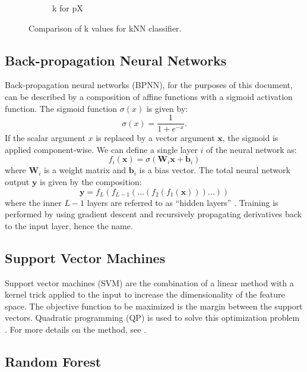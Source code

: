 \documentclass{article}
\begin{document}
\begin{figure}[h]
\begin{subfigure}{.4\columnwidth}
  \caption{k for pX}
\end{subfigure} \hfill

\caption{Comparison of k values for kNN classifier.}
\label{fig:kvalues}
\end{figure}


\subsection{Back-propagation Neural Networks}

Back-propagation neural networks (BPNN), for the purposes of this document, can be described by a composition of affine functions with a sigmoid activation function. The sigmoid function $\sigma(x)$ is given by:
\begin{equation}
    \sigma(x) = \frac{1}{1 + e^{-x}}.
\end{equation}
If the scalar argument $x$ is replaced by a vector argument $\mathbf x$, the sigmoid is applied component-wise. We can define a single layer $i$ of the neural network as:
\begin{equation}
    f_i(\mathbf x) = \sigma ( \mathbf W_i \mathbf x + \mathbf b_i)
\end{equation}
where $\mathbf W_i$ is a weight matrix and $\mathbf b_i$ is a bias vector. The total neural network output $\mathbf y$ is given by the composition:
\begin{equation}
    \mathbf y = f_L(f_{L-1}( \ldots (f_2(f_1(\mathbf x) )) \ldots ))
\end{equation}
where the inner $L-1$ layers are referred to as ``hidden layers'' \citep{goodfellow2016deep}.  Training is performed by using gradient descent and recursively propagating derivatives back to the input layer, hence the name. 

\subsection{Support Vector Machines}

Support vector machines (SVM) are the combination of a linear method with a kernel trick applied to the input to increase the dimensionality of the feature space. The objective function to be maximized is the margin between the support vectors. Quadratic programming (QP) is used to solve this optimization problem \citep{bishop2006pattern}. For more details on the method, see \citet{noble2006support}.


\subsection{Random Forest}
\end{document}
